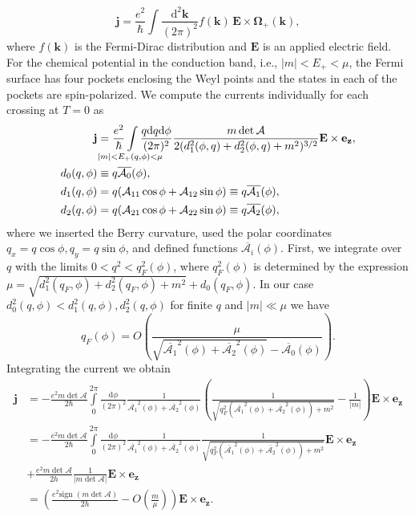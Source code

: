 \documentclass[aps,preprintnumbers,amsmath,amssymb]{revtex4-2}
\begin{document}
\begin{equation}
    \mathbf{j} = \frac{e^2}{\hbar} \int \frac{\text{d}^2 \mathbf{k}}{(2\pi)^2} f(\mathbf{k}) \, \mathbf{E} \times \mathbf{\Omega}_+(\mathbf{k}),
\end{equation}
where $f(\mathbf{k})$ is the Fermi-Dirac distribution and $\mathbf{E}$ is an applied electric field.
For the chemical potential in the conduction band, i.e., $|m| < E_+ < \mu$, the Fermi surface has four pockets enclosing the Weyl points and the states in each of the pockets are spin-polarized. We compute the currents individually for each crossing at $T=0$ as
\begin{align}
    \mathbf{j}  &= \frac{e^2}{\hbar} \int \limits_{\mathclap{|m| < E_+(q, \phi) < \mu}} \frac{q\text{d}q\text{d}\phi}{(2\pi)^2}\frac{ m\det \mathcal{A}}{2(d_1^2(\phi, q)+d_2^2(\phi, q)+m^2)^{3/2}}\mathbf{E} \times \mathbf{e_z},\\
    d_0(q, \phi) &\equiv q\overline{\mathcal{A}_0}(\phi),\\
    d_1(q, \phi) &= q(\mathcal{A}_{11}\cos\phi+\mathcal{A}_{12}\sin \phi) \equiv q \overline{\mathcal{A}_1}(\phi),\\
    d_2(q, \phi) &= q(\mathcal{A}_{21}\cos\phi+\mathcal{A}_{22}\sin \phi) \equiv q \overline{\mathcal{A}_2}(\phi),
\end{align}
where we inserted the Berry curvature, used the polar coordinates $q_x = q \cos{\phi}, q_y = q \sin{\phi}$, and defined functions $\overline{\mathcal{A}_i}(\phi)$. First, we integrate over $q$ with the limits $0 < q^2 < q^2_{F}(\phi)$, where $q^2_{F}(\phi)$ is determined by the expression $\mu = \sqrt{d_1^2(q_{F},\phi)+ d_2^2(q_{F},\phi)+ m^2} + d_0(q_{F},\phi)$. In our case $d_0^2(q,\phi) < d_1^2(q,\phi), d_2^2(q,\phi)$ for finite $q$ and $|m|\ll \mu$ we have
\begin{equation}
    q_F(\phi) = O \left( \frac{\mu}{ 
\sqrt{\overline{\mathcal{A}_1}^2(\phi) +\overline{\mathcal{A}_2}^2(\phi)} - \overline{\mathcal{A}_0}(\phi) 
} \right).
\end{equation}
Integrating the current we obtain
\begin{align}
\mathbf{j}  &= -\frac{e^2 m \det \mathcal{A}}{2\hbar} \int \limits_{0}^{2\pi} \frac{\text{d}\phi}{(2\pi)^2} \frac{1}{\overline{\mathcal{A}_1}^2(\phi) +\overline{\mathcal{A}_2}^2(\phi)}   \left(\frac{ 1}{\sqrt{q_{F}^2(\overline{\mathcal{A}_1}^2(\phi) +\overline{\mathcal{A}_2}^2(\phi)) +m^2}} - \frac{ 1}{|m|}\right) \mathbf{E} \times \mathbf{e_z} \\
&= -\frac{e^2 m \det \mathcal{A}}{2\hbar} \int \limits_{0}^{2\pi} \frac{\text{d}\phi}{(2\pi)^2} \frac{1}{\overline{\mathcal{A}_1}^2(\phi) +\overline{\mathcal{A}_2}^2(\phi)} \frac{ 1}{\sqrt{q_{F}^2(\overline{\mathcal{A}_1}^2(\phi) +\overline{\mathcal{A}_2}^2(\phi)) +m^2}}
\mathbf{E} \times \mathbf{e_z}\\
&+\frac{e^2 m\det \mathcal{A}}{2h} \frac{1}{|m\det\mathcal{A}|} \mathbf{E} \times \mathbf{e_z}\\
&= \left(\frac{e^2 \text{sign } (m \det \mathcal{A})}{2h} - O\left(\frac{m}{\mu}\right)\right)\mathbf{E} \times \mathbf{e_z}.
\end{align}
\end{document}
